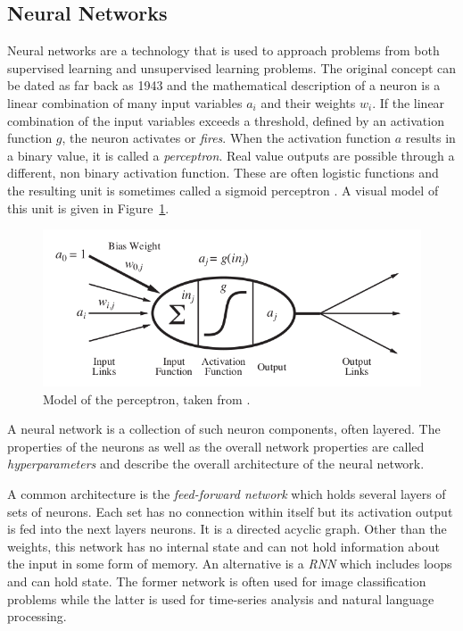 \subsection{Neural Networks}%
\label{sec:neural_networks}



Neural networks are a technology that is used to approach problems from both supervised learning and unsupervised learning problems. The original
concept can be dated  as far back as 1943 \cite[p.727]{russell2016artificial} and the mathematical description of a
neuron is a linear combination of many input variables $a_i$ and their weights $w_i$. If the linear combination of the
input variables exceeds a threshold, defined by an activation function $g$, the neuron activates or \emph{fires}. When
the activation function $a$ results in a binary value, it is called a \emph{perceptron}. Real value outputs are possible
through a different, non binary activation function. These are often logistic functions and the resulting unit is
sometimes called a sigmoid perceptron \cite[p.729]{russell2016artificial}. A visual model of this unit
is given in Figure~\ref{fig:perceptron}.

\begin{figure}[]
    \centering
    \includegraphics[width=0.8\linewidth]{img/perceptron.png}
    \caption{Model of the perceptron, taken from \cite[]{russell2016artificial}.}
    \label{fig:perceptron}
\end{figure}

A neural network  is a collection of such neuron components, often layered. The properties of the neurons as well
as the overall network properties are called \emph{hyperparameters} and describe the overall architecture of the neural network.

A common architecture is the \emph{feed-forward network} which holds several layers of sets of neurons. Each set has no
connection within itself but its activation output is fed into the next layers neurons. It is a directed
acyclic graph. Other than the weights, this network has no internal state and can not hold information about
the input in some form of memory. An alternative is a \emph{\acl {RNN} } which includes loops and can
hold state. The former network is often used for image classification problems while the latter is used for
time-series analysis and natural language processing.

